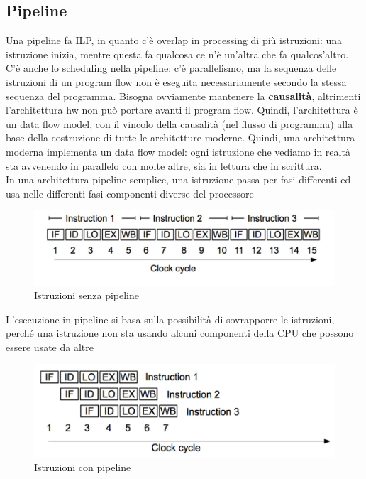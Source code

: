 \documentclass[14pt]{article}
\begin{document}
\subsection{Pipeline}
Una pipeline fa ILP, in quanto c'è overlap in processing di più istruzioni: una istruzione inizia, mentre questa fa qualcosa ce n'è un'altra che fa qualcos'altro. C'è anche lo scheduling nella pipeline: c'è parallelismo, ma la sequenza delle istruzioni di un program flow non è eseguita necessariamente secondo la stessa sequenza del programma. Bisogna ovviamente mantenere la \textbf{causalità}, altrimenti l'architettura hw non può portare avanti il program flow. Quindi, l'architettura è un data flow model, con il vincolo della causalità (nel flusso di programma) alla base della costruzione di tutte le architetture moderne. Quindi, una architettura moderna implementa un data flow model: ogni istruzione che vediamo in realtà sta avvenendo in parallelo con molte altre, sia in lettura che in scrittura.\\ In una architettura pipeline semplice, una istruzione passa per fasi differenti ed usa nelle differenti fasi componenti diverse del processore
\begin{figure}[ht!]
\includegraphics[scale=0.3]{immagini/no-pipeline}
\caption{Istruzioni senza pipeline}
\end{figure}
L'esecuzione in pipeline si basa sulla possibilità di sovrapporre le istruzioni, perché una istruzione non sta usando alcuni componenti della CPU che possono essere usate da altre
\begin{figure}[ht!]
\includegraphics[scale=0.3]{immagini/pipeline}
\caption{Istruzioni con pipeline}
\end{figure}
\end{document}
